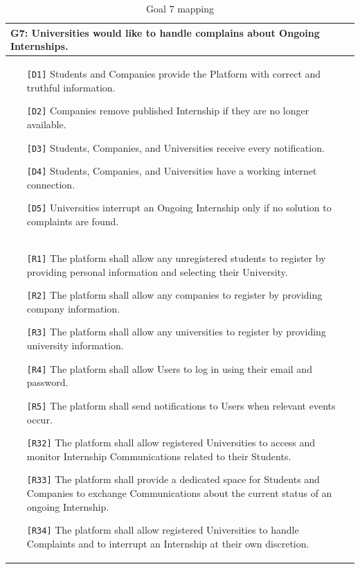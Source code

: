 \begin{table}[H]
    \centering
    \begin{tabular}{|p{15cm}|}
        \hline
        \textbf{G7:} Universities would like to handle complains about Ongoing Internships. \\ \hline
        \begin{itemize}
            \item[\texttt{[D1]}] Students and Companies provide the Platform with correct and truthful information.
            \item[\texttt{[D2]}] Companies remove published Internship if they are no longer available. 
            \item[\texttt{[D3]}] Students, Companies, and Universities receive every notification.
            \item[\texttt{[D4]}] Students, Companies, and Universities have a working internet connection.
            \item[\texttt{[D5]}] Universities interrupt an Ongoing Internship only if no solution to complaints are found.
        \end{itemize} \\ \hline
        \begin{itemize}
            \item[\texttt{[R1]}] The platform shall allow any unregistered students to register by providing personal information and selecting their University.
            \item[\texttt{[R2]}] The platform shall allow any companies to register by providing company information.
            \item[\texttt{[R3]}] The platform shall allow any universities to register by providing university information.
            \item[\texttt{[R4]}] The platform shall allow Users to log in using their email and password.
            \item[\texttt{[R5]}] The platform shall send notifications to Users when relevant events occur.
            \item[\texttt{[R32]}] The platform shall allow registered Universities to access and monitor Internship Communications related to their Students.
            \item[\texttt{[R33]}] The platform shall provide a dedicated space for Students and Companies to exchange Communications about the current status of an ongoing Internship.
            \item[\texttt{[R34]}] The platform shall allow registered Universities to handle Complaints and to interrupt an Internship at their own discretion.
        \end{itemize} \\ \hline
    \end{tabular}
    \caption{Goal 7 mapping}
    \label{tab:G7}
\end{table}


